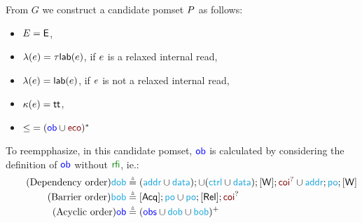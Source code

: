 From $G$ we construct a candidate pomset $P$ as follows:
\begin{itemize}
\item $E= \textsf{E}$,
\item $\lambda(e)=\tau \mathsf{lab}(e)$, if $e$ is a relaxed
  internal read, 
\item $\lambda(e)=\mathsf{lab}(e)$, if $e$ is not a relaxed
  internal read,
\item $\kappa(e)=\mathsf{tt}$,
\item ${\gtN} = ({\rob} \cup {\reco})^*$
\end{itemize}
To reempphasize, in this candidate pomset, $\mathrel{\textcolor{blue}{\mathsf{ob}}}$ is calculated by considering the definition of $\mathrel{\textcolor{blue}{\mathsf{ob}}}$ without $\rrfi$, ie.:
\begin{align*}
  \tag{Dependency order}
  {\rdob} &\eqdef\smash{
    ({\raddr}\cup{\rdata});
    \cup ({\rctrl}\cup{\rdata}); {\IDW}; {\rcoi}^?
    \cup {\raddr}; {\rpox}; {\IDW}
  }
  \\
  \tag{Barrier order}
  {\rbob} &\eqdef\smash{
    {\IDAcq}; {\rpox}
    \cup {\rpox};{\IDRel}; {\rcoi}^?
  }
  \\
  \tag{Acyclic order}
  {\rob} &\eqdef\smash{
    ({\robs} \cup {\rdob} \cup {\rbob})^+
  }
\end{align*}


